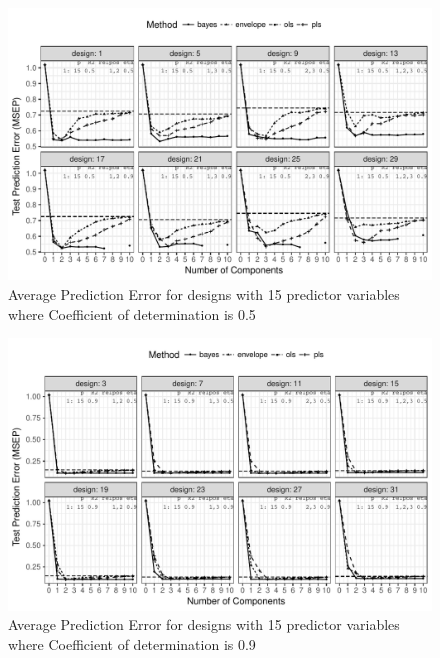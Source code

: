 \documentclass[12pt, a4paper]{article}
\begin{document}
\begin{figure}[!ht]
  \centering
  \includegraphics[width = \textwidth]{pdf/prediction-error-15-1.pdf}
  \caption[Prediction Error]{Average Prediction Error for designs with 15 predictor
    variables where Coefficient of determination is 0.5}
  \label{fig:pred-error-15-1}
\end{figure}

\pagebreak

\begin{figure}[!ht]
  \centering
  \includegraphics[width = \textwidth]{pdf/prediction-error-15-2.pdf}
  \caption[Prediction Error]{Average Prediction Error for designs with 15 predictor
    variables where Coefficient of determination is 0.9}
  \label{fig:pred-error-15-2}
\end{figure}

\pagebreak
\end{document}
